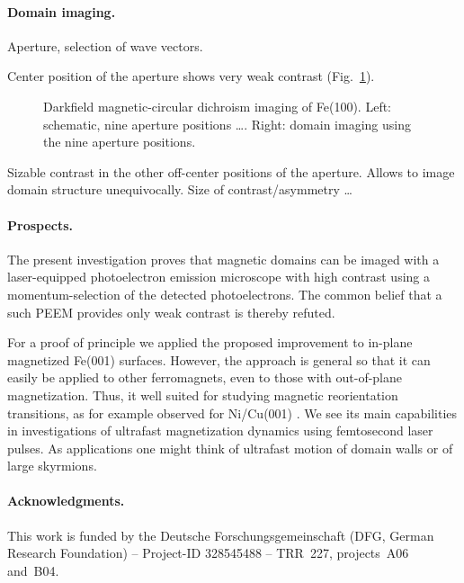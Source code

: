 \documentclass[prl,twocolumn,floatfix]{revtex4-2}
\begin{document}
\paragraph{Domain imaging.} Aperture, selection of wave vectors.

Center position of the aperture shows very weak contrast (Fig.~\ref{fig:Imaging}).

\begin{figure}
    \centering
    \caption{Darkfield magnetic-circular dichroism imaging of Fe(100). Left: schematic, nine aperture positions \ldots. Right: domain imaging using the nine aperture positions.}
    \label{fig:Imaging}
\end{figure}

Sizable contrast in the other off-center positions of the aperture. Allows to image domain structure unequivocally. Size of contrast/asymmetry \ldots

\paragraph{Prospects.} The present investigation proves that magnetic domains can be imaged with a laser-equipped photoelectron emission microscope with high contrast using a momentum-selection of the detected photoelectrons. The common belief that a such PEEM provides only weak contrast is thereby refuted.

For a proof of principle we applied the proposed improvement to in-plane magnetized Fe(001) surfaces. However, the approach is general so that it can easily be applied to other ferromagnets, even to those with out-of-plane magnetization. Thus, it well suited for studying magnetic reorientation transitions, as for example observed for Ni/Cu(001) . We see its main capabilities in investigations of ultrafast magnetization dynamics using femtosecond laser pulses. As applications one might think of ultrafast motion of domain walls  or of large skyrmions.

\paragraph{Acknowledgments.} This work is funded by the Deutsche Forschungsgemeinschaft (DFG, German Research Foundation) -- Project-ID 328545488 -- TRR~227, projects~A06 and~B04.

% 


\listoftodos
\end{document}
